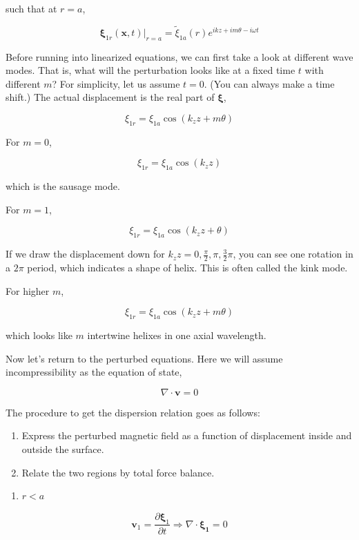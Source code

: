 \documentclass[
  notoc %
]{tufte-book}
\providecommand{\tightlist}{%
  \setlength{\itemsep}{0pt}\setlength{\parskip}{0pt}
}
\begin{document}
such that at \(r=a\),

\[
\pmb{\xi}_{1r}(\mathbf{x},t)\big|_{r=a} = \widetilde{\xi}_{1a}(r)e^{ikz + im\theta-i\omega t}
\]

Before running into linearized equations, we can first take a look at
different wave modes. That is, what will the perturbation looks like at
a fixed time \(t\) with different \(m\)? For simplicity, let us assume
\(t=0\). (You can always make a time shift.) The actual displacement is
the real part of \(\pmb{\xi}\),

\[
\xi_{1r} = \xi_{1a}\cos(k_z z+m\theta)
\]

For \(m=0\),

\[
\xi_{1r} = \xi_{1a}\cos(k_z z)
\]

which is the sausage mode.

For \(m=1\),

\[
\xi_{1r} = \xi_{1a}\cos(k_z z+\theta)
\]

If we draw the displacement down for
\(k_z z=0,\frac{\pi}{2},\pi,\frac{3}{2}\pi\), you can see one rotation
in a \(2\pi\) period, which indicates a shape of helix. This is often
called the kink mode.

For higher \(m\),

\[
\xi_{1r} = \xi_{1a}\cos(k_z z+m\theta)
\]

which looks like \(m\) intertwine helixes in one axial wavelength.

Now let's return to the perturbed equations. Here we will assume
incompressibility as the equation of state,

\[
\nabla\cdot\mathbf{v}=0
\]

The procedure to get the dispersion relation goes as follows:

\begin{enumerate}
\def\labelenumi{\arabic{enumi}.}
\tightlist
\item
  Express the perturbed magnetic field as a function of displacement
  inside and outside the surface.
\item
  Relate the two regions by total force balance.
\end{enumerate}

\begin{enumerate}
\def\labelenumi{(\Roman{enumi})}
\tightlist
\item
  \(r<a\)
\end{enumerate}

\[
\mathbf{v}_1=\frac{\partial \pmb{\xi}_1}{\partial t} \Rightarrow \nabla\cdot\pmb{\xi_1}=0
\]
\end{document}
